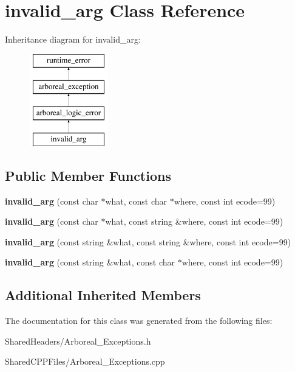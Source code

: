 \hypertarget{classinvalid__arg}{}\section{invalid\+\_\+arg Class Reference}
\label{classinvalid__arg}
Inheritance diagram for invalid\+\_\+arg\+:\begin{figure}[H]
\begin{center}
\leavevmode
\includegraphics[height=4.000000cm]{classinvalid__arg}
\end{center}
\end{figure}
\subsection*{Public Member Functions}
\begin{DoxyCompactItemize}
\item 
{\bfseries invalid\+\_\+arg} (const char $\ast$what, const char $\ast$where, const int ecode=99)\hypertarget{classinvalid__arg_ab470c1e208290687c57ddb80ad7c91bf}{}\label{classinvalid__arg_ab470c1e208290687c57ddb80ad7c91bf}

\item 
{\bfseries invalid\+\_\+arg} (const char $\ast$what, const string \&where, const int ecode=99)\hypertarget{classinvalid__arg_ac64346933956c640dc48166d3c11ea6d}{}\label{classinvalid__arg_ac64346933956c640dc48166d3c11ea6d}

\item 
{\bfseries invalid\+\_\+arg} (const string \&what, const string \&where, const int ecode=99)\hypertarget{classinvalid__arg_afd1c07ada97de63dd8b2bf8d19753649}{}\label{classinvalid__arg_afd1c07ada97de63dd8b2bf8d19753649}

\item 
{\bfseries invalid\+\_\+arg} (const string \&what, const char $\ast$where, const int ecode=99)\hypertarget{classinvalid__arg_a1b68c46a8c2ddc202eb89edf05667618}{}\label{classinvalid__arg_a1b68c46a8c2ddc202eb89edf05667618}

\end{DoxyCompactItemize}
\subsection*{Additional Inherited Members}


The documentation for this class was generated from the following files\+:\begin{DoxyCompactItemize}
\item 
Shared\+Headers/Arboreal\+\_\+\+Exceptions.\+h\item 
Shared\+C\+P\+P\+Files/Arboreal\+\_\+\+Exceptions.\+cpp\end{DoxyCompactItemize}
